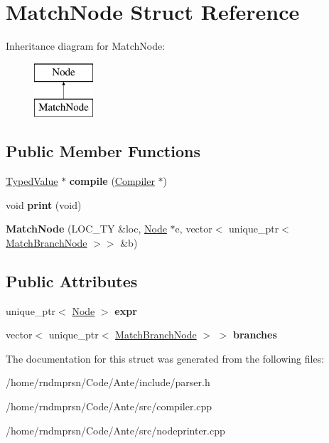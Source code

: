 \hypertarget{structMatchNode}{}\section{Match\+Node Struct Reference}
\label{structMatchNode}
Inheritance diagram for Match\+Node\+:\begin{figure}[H]
\begin{center}
\leavevmode
\includegraphics[height=2.000000cm]{structMatchNode}
\end{center}
\end{figure}
\subsection*{Public Member Functions}
\begin{DoxyCompactItemize}
\item 
\mbox{\label{structMatchNode_a524754e21a331549a17dd122fa1aa44f}} 
\hyperlink{structTypedValue}{Typed\+Value} $\ast$ {\bfseries compile} (\hyperlink{structante_1_1Compiler}{Compiler} $\ast$)
\item 
\mbox{\label{structMatchNode_aad21cde01361fc8aa0f1aa00a935d63b}} 
void {\bfseries print} (void)
\item 
\mbox{\label{structMatchNode_ab03b95aea8f70db94614863eb0df792c}} 
{\bfseries Match\+Node} (L\+O\+C\+\_\+\+TY \&loc, \hyperlink{structNode}{Node} $\ast$e, vector$<$ unique\+\_\+ptr$<$ \hyperlink{structMatchBranchNode}{Match\+Branch\+Node} $>$$>$ \&b)
\end{DoxyCompactItemize}
\subsection*{Public Attributes}
\begin{DoxyCompactItemize}
\item 
\mbox{\label{structMatchNode_a915991d199ae1c76c6d6b476e0fcd30e}} 
unique\+\_\+ptr$<$ \hyperlink{structNode}{Node} $>$ {\bfseries expr}
\item 
\mbox{\label{structMatchNode_ab809a03e4a5b920bca39dc625d294953}} 
vector$<$ unique\+\_\+ptr$<$ \hyperlink{structMatchBranchNode}{Match\+Branch\+Node} $>$ $>$ {\bfseries branches}
\end{DoxyCompactItemize}


The documentation for this struct was generated from the following files\+:\begin{DoxyCompactItemize}
\item 
/home/rndmprsn/\+Code/\+Ante/include/parser.\+h\item 
/home/rndmprsn/\+Code/\+Ante/src/compiler.\+cpp\item 
/home/rndmprsn/\+Code/\+Ante/src/nodeprinter.\+cpp\end{DoxyCompactItemize}
